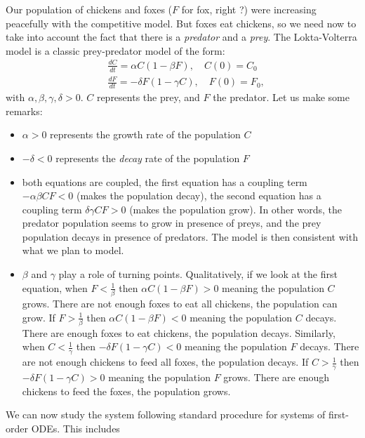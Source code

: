 Our population of chickens and foxes ($F$ for fox, right ?) were increasing peacefully with the competitive model. But foxes eat chickens, so we need now to take into account the fact that there is a \textit{predator} and a \textit{prey}. The Lokta-Volterra model is a classic prey-predator model of the form:
 \begin{equation}\label{eq:prey-pred}
 \begin{aligned}
&\displaystyle \frac{dC}{dt} = \alpha C \left( 1 - \beta F\right)  ,\quad C(0) = C_0\\ 
&\displaystyle \frac{dF}{dt} = -  \delta F \left( 1 - \gamma C \right)  ,\quad F(0) = F_0,
\end{aligned}
\end{equation}
with $\alpha, \beta, \gamma, \delta >0$. $C$ represents the prey, and $F$ the predator. Let us make some remarks:
\begin{itemize}
\item $\alpha >0$ represents the growth rate of the population $C$
\item $- \delta < 0$ represents the \textit{decay} rate of the population $F$
\item both equations are coupled, the first equation has a coupling term $-\alpha \beta  CF <0$ (makes the population decay), the second equation has a coupling term $\delta \gamma CF >0$ (makes the population grow). In other words, the predator population seems to grow in presence of preys, and the prey population decays in presence of predators. The model is then consistent with what we plan to model.
\item $\beta$ and $\gamma$ play a role of turning points. Qualitatively, if we look at the first equation, when $F < \frac{1}{\beta}$ then $  \alpha C \left( 1 - \beta F\right) >0$ meaning the population $C$ grows. There are not enough foxes to eat all chickens, the population can grow. If $F > \frac{1}{\beta}$ then $  \alpha C \left( 1 - \beta F\right) <0$ meaning the population $C$ decays. There are enough foxes to eat chickens, the population decays. Similarly, when $C < \frac{1}{\gamma}$ then $  -  \delta F \left( 1 - \gamma C \right) < 0$ meaning the population $F$ decays. There are not enough chickens to feed all foxes, the population decays. If $C > \frac{1}{\gamma}$ then $  -  \delta F \left( 1 - \gamma C \right) >0$ meaning the population $F$ grows. There are enough chickens to feed the foxes, the population grows.
\end{itemize}
We can now study the system following standard procedure for systems of first-order ODEs. This includes
